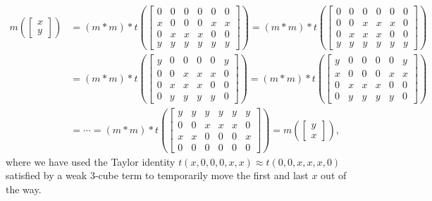\documentclass[letterpaper,11pt]{article}
\begin{document}
\begin{rem}
\begin{align*}
m\left(\begin{bmatrix} x\\ y \end{bmatrix}\right) &= (m*m)*t\left(\begin{bmatrix} 0 & 0 & 0 & 0 & 0 & 0 \\ x & 0 & 0 & 0 & x & x \\ 0 & x & x & x & 0 & 0 \\ y & y & y & y & y & y\end{bmatrix}\right) = (m*m)*t\left(\begin{bmatrix} 0 & 0 & 0 & 0 & 0 & 0 \\ 0 & 0 & x & x & x & 0 \\ 0 & x & x & x & 0 & 0 \\ y & y & y & y & y & y\end{bmatrix}\right)\\
&= (m*m)*t\left(\begin{bmatrix} y & 0 & 0 & 0 & 0 & y \\ 0 & 0 & x & x & x & 0 \\ 0 & x & x & x & 0 & 0 \\ 0 & y & y & y & y & 0\end{bmatrix}\right) = (m*m)*t\left(\begin{bmatrix} y & 0 & 0 & 0 & 0 & y \\ x & 0 & 0 & 0 & x & x \\ 0 & x & x & x & 0 & 0 \\ 0 & y & y & y & y & 0\end{bmatrix}\right)\\
&= \cdots = (m*m)*t\left(\begin{bmatrix} y & y & y & y & y & y \\ 0 & 0 & x & x & x & 0 \\ x & x & 0 & 0 & 0 & x \\ 0 & 0 & 0 & 0 & 0 & 0\end{bmatrix}\right) = m\left(\begin{bmatrix} y\\ x \end{bmatrix}\right),
\end{align*}
where we have used the Taylor identity $t(x,0,0,0,x,x) \approx t(0,0,x,x,x,0)$ satisfied by a weak 3-cube term to temporarily move the first and last $x$ out of the way.
\end{rem}
\end{document}
